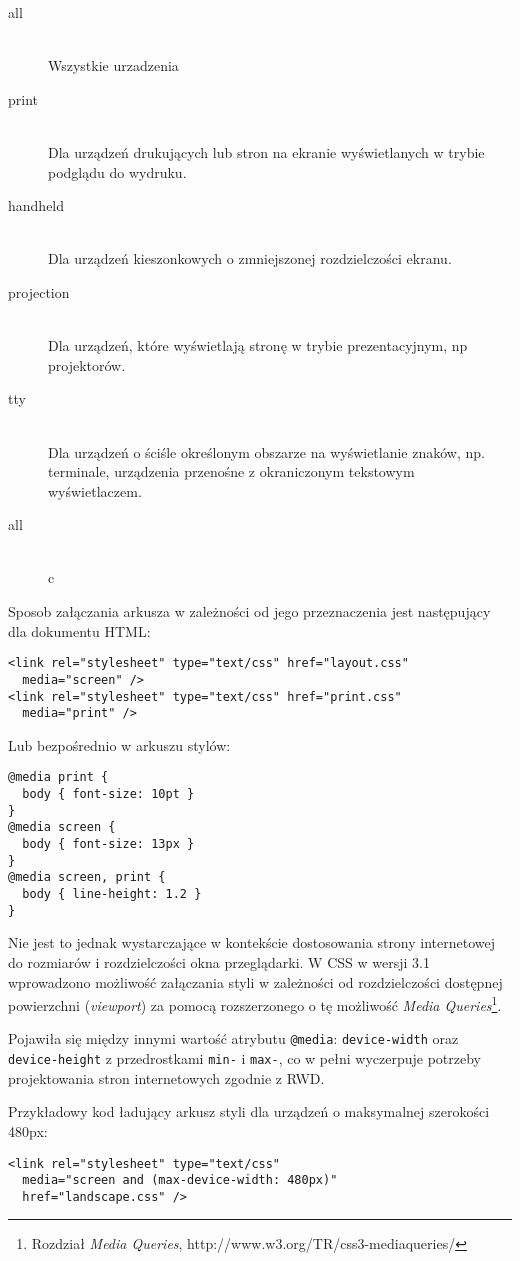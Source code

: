 \begin{description}
  \item[all] \hfill \\
  Wszystkie urzadzenia
  \item[print] \hfill \\
  Dla urządzeń drukujących lub stron na ekranie wyświetlanych w trybie podglądu do wydruku.
  \item[handheld] \hfill \\
  Dla urządzeń kieszonkowych o zmniejszonej rozdzielczości ekranu.
  \item[projection] \hfill \\
  Dla urządzeń, które wyświetlają stronę w trybie prezentacyjnym, np projektorów.
  \item[tty] \hfill \\
  Dla urządzeń o ściśle określonym obszarze na wyświetlanie znaków, np. terminale, urządzenia przenośne z okraniczonym tekstowym wyświetlaczem.
  \item[all] \hfill \\
  c
\end{description}

Sposob załączania arkusza w zależności od jego przeznaczenia jest następujący dla dokumentu HTML:

\lstset{language=HTML}
\begin{lstlisting}
<link rel="stylesheet" type="text/css" href="layout.css"
  media="screen" />
<link rel="stylesheet" type="text/css" href="print.css"
  media="print" />
\end{lstlisting}

Lub bezpośrednio w arkuszu stylów:

\lstset{language=Octave}
\begin{lstlisting}
@media print {
  body { font-size: 10pt }
}
@media screen {
  body { font-size: 13px }
}
@media screen, print {
  body { line-height: 1.2 }
}
\end{lstlisting}

Nie jest to jednak wystarczające w kontekście dostosowania strony internetowej do rozmiarów i rozdzielczości okna przeglądarki. W CSS w wersji 3.1 wprowadzono możliwość załączania styli w zależności od rozdzielczości dostępnej powierzchni (\emph{viewport}) za pomocą rozszerzonego o tę możliwość \emph{Media Queries}\cite{css3}\footnote{\cite{css3} Rozdział \emph{Media Queries}, http://www.w3.org/TR/css3-mediaqueries/}.

Pojawiła się między innymi wartość atrybutu \lstinline{@media}: \lstinline{device-width} oraz \lstinline{device-height} z przedrostkami \lstinline{min-} i \lstinline{max-}, co w pełni wyczerpuje potrzeby projektowania stron internetowych zgodnie z RWD.

Przykładowy kod ładujący arkusz styli dla urządzeń o maksymalnej szerokości 480px:

\lstset{language=Octave}
\begin{lstlisting}
<link rel="stylesheet" type="text/css"
  media="screen and (max-device-width: 480px)"
  href="landscape.css" />
\end{lstlisting}
